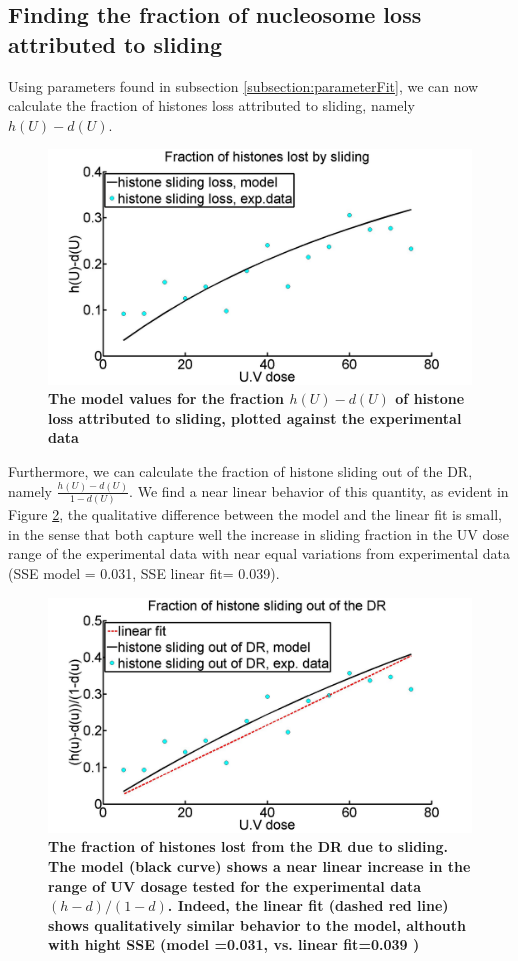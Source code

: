 \documentclass[12pt]{article}
\newcommand{\beq}{\begin{eqnarray}}
\newcommand{\eeq}{\end{eqnarray}}
\begin{document}
\subsection{Finding the fraction of nucleosome loss attributed to sliding}


Using parameters found in subsection \ref{subsection:parameterFit}, we can now calculate the fraction of histones loss attributed to sliding, namely $h(U)-d(U)$.

\begin{figure}[H]
\centering
\includegraphics[width=0.5\linewidth, height=0.3\textheight]{hVsUVDoseModelFit01}
\caption{\textbf{The model values for the fraction $h(U)-d( U)$ of histone loss attributed to sliding, plotted against the experimental data}}
\label{fig:hVsUVDoseModelFit01}
\end{figure}

Furthermore, we can calculate the fraction of histone sliding out of the DR, namely $\frac{h(U)-d(U)}{1-d(U)}$. We find a near linear behavior of this quantity, as evident
in Figure \ref{fig:histoneSlideFromDamageRegionComparision}, the qualitative difference between the model and the linear fit is small, in the sense that both capture well the increase in sliding fraction in the UV dose range of the experimental data with near equal variations from experimental data (SSE model = 0.031, SSE linear fit= 0.039).

\begin{figure}[H]
	\centering
	\includegraphics[width=0.7\linewidth, height=0.3\textheight]{histoneSlideFromDamageRegionComparision}
	\caption{\textbf{The fraction of histones lost from the DR due to sliding. The model (black curve) shows a near linear increase in the range of UV dosage tested for the experimental data $(h-d)/(1-d)$. Indeed, the linear fit (dashed red line) shows qualitatively similar behavior to the model, althouth with hight SSE (model =0.031, vs. linear fit=0.039 ) }}
	\label{fig:histoneSlideFromDamageRegionComparision}
\end{figure}
\end{document}

